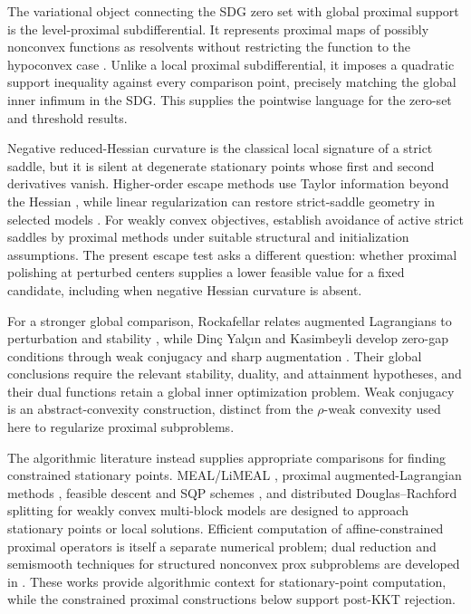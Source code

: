 The variational object connecting the SDG zero set with global proximal
support is the level-proximal subdifferential.  It represents proximal maps of
possibly nonconvex functions as resolvents without restricting the function
to the hypoconvex case \cite{WangWang2024}.  Unlike a local proximal
subdifferential, it imposes a quadratic support inequality against every
comparison point, precisely matching the global inner infimum in the SDG.
This supplies the pointwise language for the zero-set and threshold results.

Negative reduced-Hessian curvature is the classical local signature of a
strict saddle, but it is silent at degenerate stationary points whose first
and second derivatives vanish.  Higher-order escape methods use Taylor
information beyond the Hessian \cite{AnandkumarGe2016}, while linear
regularization can restore strict-saddle geometry in selected models
\cite{UblHaleYazdani2023}.  For weakly convex objectives,
\citet{DavisDrusvyatskiy2022} establish avoidance of active strict saddles
by proximal methods under suitable structural and initialization assumptions.
The present escape test asks a different question: whether proximal
polishing at perturbed centers supplies a lower feasible value for a fixed
candidate, including when negative Hessian curvature is absent.

For a stronger global comparison, Rockafellar relates augmented Lagrangians
to perturbation and stability
\cite{Rockafellar1974}, while Din\c{c} Yal\c{c}\i n and Kasimbeyli develop zero-gap
conditions through weak conjugacy and sharp augmentation
\cite{YalcinKasimbeyli2020}.  Their global conclusions require the relevant
stability, duality, and attainment hypotheses, and their dual functions retain
a global inner optimization problem.  Weak conjugacy is an
abstract-convexity construction, distinct from the \(\rho\)-weak convexity
used here to regularize proximal subproblems.

The algorithmic literature instead supplies appropriate comparisons for
finding constrained stationary points.  MEAL/LiMEAL
\cite{ZengYinZhou2022}, proximal augmented-Lagrangian methods
\cite{ZhangLuo2020}, feasible descent and SQP schemes
\cite{Rosen1960,LaleeNocedalPlantenga1998}, and distributed
Douglas--Rachford splitting for weakly convex multi-block models
\cite{HuXieCaiHan2025} are designed to approach stationary points or local
solutions.  Efficient computation of affine-constrained proximal operators is
itself a separate numerical problem; dual reduction and semismooth techniques
for structured nonconvex prox subproblems are developed in
\cite{HouTangTohWang2026}.  These works provide algorithmic context for
stationary-point computation, while the constrained proximal constructions
below support post-KKT rejection.

